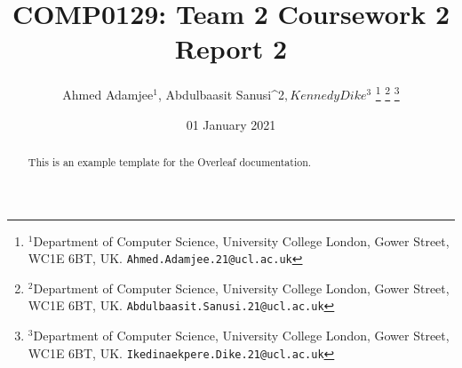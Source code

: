 \documentclass[a4paper, 10pt, conference]{ieeeconf}      %
\title{\LARGE \bf
COMP0129: Team 2 Coursework 2 Report 2
}
\author{Ahmed Adamjee$^{1}$, Abdulbaasit Sanusi^{2}$, Kennedy Dike^{3}$%
\thanks{$^{1}$Department of Computer Science, University College London, Gower Street, WC1E 6BT, UK.
{\tt\small {Ahmed.Adamjee.21}@ucl.ac.uk}}%
\thanks{$^{2}$Department of Computer Science, University College London, Gower Street, WC1E 6BT, UK.
{\tt\small {Abdulbaasit.Sanusi.21}@ucl.ac.uk}}%
\thanks{$^{3}$Department of Computer Science, University College London, Gower Street, WC1E 6BT, UK.
{\tt\small {Ikedinaekpere.Dike.21}@ucl.ac.uk}}%
}
\date{01 January 2021} %
\begin{document}
\maketitle
\thispagestyle{empty}
\pagestyle{empty}

\begin{abstract}
This is an example template for the Overleaf documentation.
\end{abstract}









\end{document}
